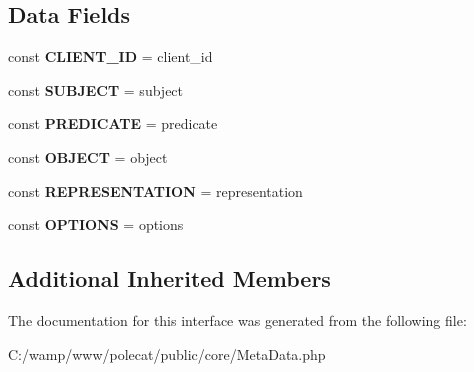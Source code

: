 \subsection*{Data Fields}
\begin{DoxyCompactItemize}
\item 
\hypertarget{interface_able_polecat___meta_data_interface_a0e851703423f0e426a72843a724fe215}{}const {\bfseries C\+L\+I\+E\+N\+T\+\_\+\+I\+D} = \textquotesingle{}client\+\_\+id\textquotesingle{}\label{interface_able_polecat___meta_data_interface_a0e851703423f0e426a72843a724fe215}

\item 
\hypertarget{interface_able_polecat___meta_data_interface_ab63ae970cd2a8405dcafc310dc3102e1}{}const {\bfseries S\+U\+B\+J\+E\+C\+T} = \textquotesingle{}subject\textquotesingle{}\label{interface_able_polecat___meta_data_interface_ab63ae970cd2a8405dcafc310dc3102e1}

\item 
\hypertarget{interface_able_polecat___meta_data_interface_a5ae84ee64ebc1100f9037309d6723a8f}{}const {\bfseries P\+R\+E\+D\+I\+C\+A\+T\+E} = \textquotesingle{}predicate\textquotesingle{}\label{interface_able_polecat___meta_data_interface_a5ae84ee64ebc1100f9037309d6723a8f}

\item 
\hypertarget{interface_able_polecat___meta_data_interface_aa2f1769baa345f301668853c444000e1}{}const {\bfseries O\+B\+J\+E\+C\+T} = \textquotesingle{}object\textquotesingle{}\label{interface_able_polecat___meta_data_interface_aa2f1769baa345f301668853c444000e1}

\item 
\hypertarget{interface_able_polecat___meta_data_interface_aa8f5c4281b26694a81509ab77da8d86c}{}const {\bfseries R\+E\+P\+R\+E\+S\+E\+N\+T\+A\+T\+I\+O\+N} = \textquotesingle{}representation\textquotesingle{}\label{interface_able_polecat___meta_data_interface_aa8f5c4281b26694a81509ab77da8d86c}

\item 
\hypertarget{interface_able_polecat___meta_data_interface_ad7a0cb2592aa45dd08251b948d43f1d6}{}const {\bfseries O\+P\+T\+I\+O\+N\+S} = \textquotesingle{}options\textquotesingle{}\label{interface_able_polecat___meta_data_interface_ad7a0cb2592aa45dd08251b948d43f1d6}

\end{DoxyCompactItemize}
\subsection*{Additional Inherited Members}


The documentation for this interface was generated from the following file\+:\begin{DoxyCompactItemize}
\item 
C\+:/wamp/www/polecat/public/core/Meta\+Data.\+php\end{DoxyCompactItemize}
